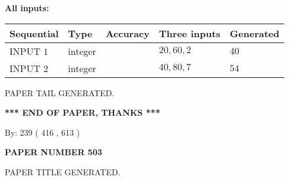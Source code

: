 \documentclass[12pt]{article}
\begin{document}
   
   
   
\noindent\vspace{0.1in}\hspace{-0.08in} {\textbf{\Large{All inputs: }}}
   
   
  
  
\noindent\begin{tabular}{|l|l|l|l|l|}
\hline
 Sequential & Type & Accuracy & Three inputs & Generated \\ 
\hline
 
 
  INPUT $  1 $ & integer &  & $
 20
 , 
 60
 , 
 2
 $ & $ 40 $ 
 \\  \hline  
 
 
  INPUT $  2 $ & integer &  & $
 40
 , 
 80
 , 
 7
 $ & $ 54 $ 
 \\  \hline  
 \end{tabular}
   
   
   
   
   
   
 \vspace{0.2in}
 
   
   
\vspace{2.0in} PAPER TAIL GENERATED.
   
   
   
   
\vspace{1.0in} 
{\textbf{\large{ *** END OF PAPER, THANKS *** }}} 
   
   
\hspace{1.0in} By: 
 239 ( 416 ,  613 )
   
   
   
   
\newpage 
\setcounter{page}{ 
   503001 } 
   
   
   
   
 {\textbf{ \Large{ PAPER NUMBER  503  }}}
   
   
\vspace{0.2in}
   
   
   
   
   
   
   
   
 \vspace{0.2in}
 
 
 
 
   
   
 PAPER TITLE GENERATED.
   
   
   
\vspace{0.2in}
   
\end{document}
